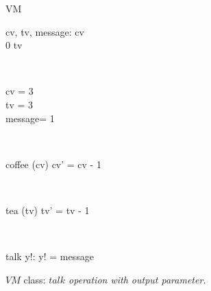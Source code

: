 \begin{figure}[H]
\centering
\begin{class}{VM}
\\
\begin{state}
cv, tv, message: \integer
{} \leq  cv 
\\
0 \leq  tv 
\end{state} 
\\
\begin{init}
cv = 3
\\tv = 3
\\ message= 1
\end{init} 
\\
\begin{op}{coffee}
\Delta (cv)
\ST
cv' = cv - 1
\end{op}
\\
\begin{op}{tea}
\Delta (tv)
\ST
tv' = tv - 1
\end{op}
\\
\begin{op}{talk}
y!: \integer
\ST
y! = message
\end{op}
\end{class}
\caption{$VM$ class: \textit{$talk$ operation with output parameter.}}
\label{oz_vm_with_operation_input_output_parameters}
\end{figure}